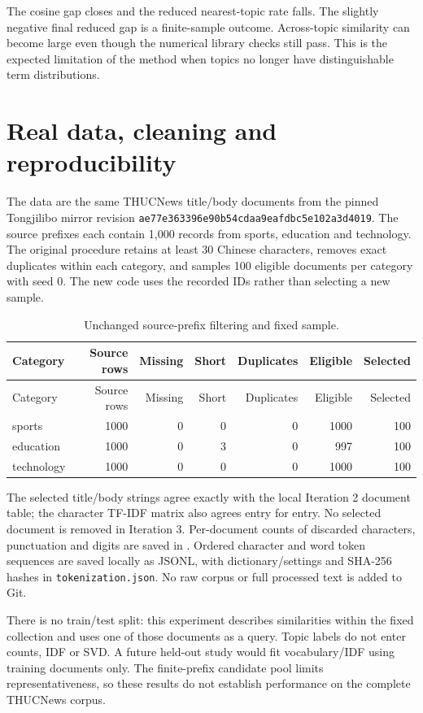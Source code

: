 \documentclass[11pt]{article}
\renewcommand{\arraystretch}{1.15}
\begin{document}
The cosine gap closes and the reduced nearest-topic rate falls.
The slightly negative final reduced gap is a finite-sample outcome.
Across-topic similarity can become large even though the numerical
library checks still pass. This is the expected limitation of the
method when topics no longer have distinguishable term distributions.

\section{Real data, cleaning and reproducibility}
The data are the same THUCNews title/body documents from the pinned
Tongjilibo mirror revision
\texttt{ae77e363396e90b54cdaa9eafdbc5e102a3d4019}.
The source prefixes each contain 1,000 records from sports, education
and technology. The original procedure retains at least 30 Chinese
characters, removes exact duplicates within each category, and samples
100 eligible documents per category with seed 0.
The new code uses the recorded IDs rather than selecting a new sample.
{\small\renewcommand{\arraystretch}{1.05}
\begin{longtable}{lrrrrrr}
\caption{Unchanged source-prefix filtering and fixed sample.}\\
\toprule
Category & Source rows & Missing & Short & Duplicates & Eligible & Selected \\ \midrule\endfirsthead
\toprule
Category & Source rows & Missing & Short & Duplicates & Eligible & Selected \\ \midrule\endhead
sports & 1000 & 0 & 0 & 0 & 1000 & 100 \\
education & 1000 & 0 & 3 & 0 & 997 & 100 \\
technology & 1000 & 0 & 0 & 0 & 1000 & 100 \\
\bottomrule
\end{longtable}
}

The selected title/body strings agree exactly with the local Iteration 2
document table; the character TF-IDF matrix also agrees entry for entry.
No selected document is removed in Iteration 3.
Per-document counts of discarded characters, punctuation and digits
are saved in . Ordered character and word
token sequences are saved locally as JSONL, with dictionary/settings
and SHA-256 hashes in \texttt{tokenization.json}.
No raw corpus or full processed text is added to Git.

There is no train/test split: this experiment describes similarities
within the fixed collection and uses one of those documents as a
query. Topic labels do not enter counts, IDF or SVD. A future held-out
study would fit vocabulary/IDF using training documents only.
The finite-prefix candidate pool limits representativeness, so these
results do not establish performance on the complete THUCNews corpus.
\end{document}
